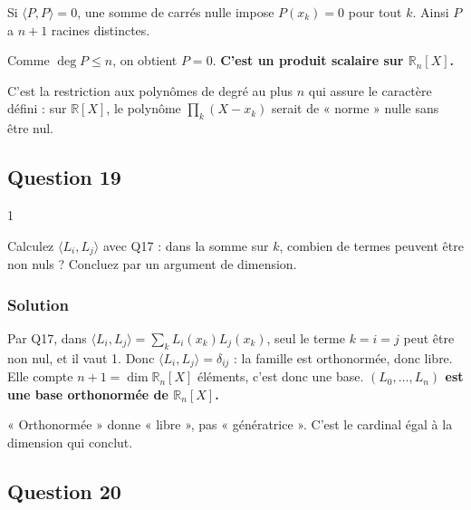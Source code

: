 \documentclass[11pt,a4paper]{article}
\begin{document}
Si \(\langle P,P\rangle=0\), une somme de carrés nulle impose \(P(x_k)=0\) pour tout \(k\). Ainsi \(P\) a \(n+1\) racines distinctes.

Comme \(\deg P\leqslant n\), on obtient \(P=0\). \textbf{C'est un produit scalaire sur \(\mathbb R_n[X]\).}

\begin{piege}

C'est la restriction aux polynômes de degré au plus \(n\) qui assure le caractère défini : sur \(\mathbb R[X]\), le polynôme \(\prod_k(X-x_k)\) serait de « norme » nulle sans être nul.

\end{piege}

\hypertarget{question-19}{%
\subsection{Question 19}\label{question-19}}

\begin{indication}{1}

Calculez \(\langle L_i,L_j\rangle\) avec Q17 : dans la somme sur \(k\), combien de termes peuvent être non nuls ? Concluez par un argument de dimension.

\end{indication}

\hypertarget{solution-18}{%
\subsubsection{Solution}\label{solution-18}}

Par Q17, dans \(\langle L_i,L_j\rangle=\sum_kL_i(x_k)L_j(x_k)\), seul le terme \(k=i=j\) peut être non nul, et il vaut 1. Donc \(\langle L_i,L_j\rangle=\delta_{ij}\) : la famille est orthonormée, donc libre. Elle compte \(n+1=\dim\mathbb R_n[X]\) éléments, c'est donc une base. \textbf{\((L_0,\dots,L_n)\) est une base orthonormée de \(\mathbb R_n[X]\).}

\begin{piege}

« Orthonormée » donne « libre », pas « génératrice ». C'est le cardinal égal à la dimension qui conclut.

\end{piege}

\hypertarget{question-20}{%
\subsection{Question 20}\label{question-20}}
\end{document}

